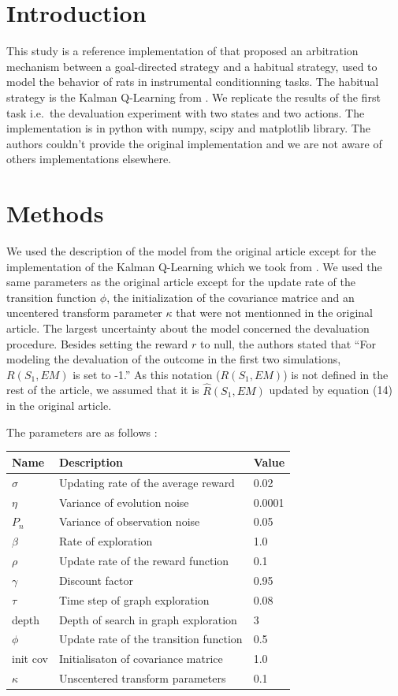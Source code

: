 \documentclass[10pt,a4paper,onecolumn]{article}
\begin{document}
\section{Introduction}\label{introduction}

This study is a reference implementation of \textcite{keramati} that
proposed an arbitration mechanism between a goal-directed strategy and a
habitual strategy, used to model the behavior of rats in instrumental
conditionning tasks. The habitual strategy is the Kalman Q-Learning from
\textcite{geist}. We replicate the results of the first task i.e.~the
devaluation experiment with two states and two actions. The
implementation is in python with numpy, scipy and matplotlib library.
The authors couldn't provide the original implementation and we are not
aware of others implementations elsewhere.

\section{Methods}\label{methods}

We used the description of the model from the original article except
for the implementation of the Kalman Q-Learning which we took from
\textcite{geist}. We used the same parameters as the original article
except for the update rate of the transition function \(\phi\), the
initialization of the covariance matrice and an uncentered transform
parameter \(\kappa\) that were not mentionned in the original article.
The largest uncertainty about the model concerned the devaluation
procedure. Besides setting the reward \(r\) to null, the authors stated
that ``For modeling the devaluation of the outcome in the first two
simulations, \(R(S_1, EM)\) is set to -1.'' As this notation
(\(R(S_1, EM)\)) is not defined in the rest of the article, we assumed
that it is \(\hat{R}(S_1, EM)\) updated by equation (14) in the original
article.

The parameters are as follows :

\begin{longtable}[c]{@{}lll@{}}
\toprule
Name & Description & Value\tabularnewline
\midrule
\endhead
\(\sigma\) & Updating rate of the average reward & 0.02\tabularnewline
\(\eta\) & Variance of evolution noise & 0.0001\tabularnewline
\(P_n\) & Variance of observation noise & 0.05\tabularnewline
\(\beta\) & Rate of exploration & 1.0\tabularnewline
\(\rho\) & Update rate of the reward function & 0.1\tabularnewline
\(\gamma\) & Discount factor & 0.95\tabularnewline
\(\tau\) & Time step of graph exploration & 0.08\tabularnewline
depth & Depth of search in graph exploration & 3\tabularnewline
\(\phi\) & Update rate of the transition function & 0.5\tabularnewline
init cov & Initialisaton of covariance matrice & 1.0\tabularnewline
\(\kappa\) & Unscentered transform parameters & 0.1\tabularnewline
\bottomrule
\end{longtable}
\end{document}
